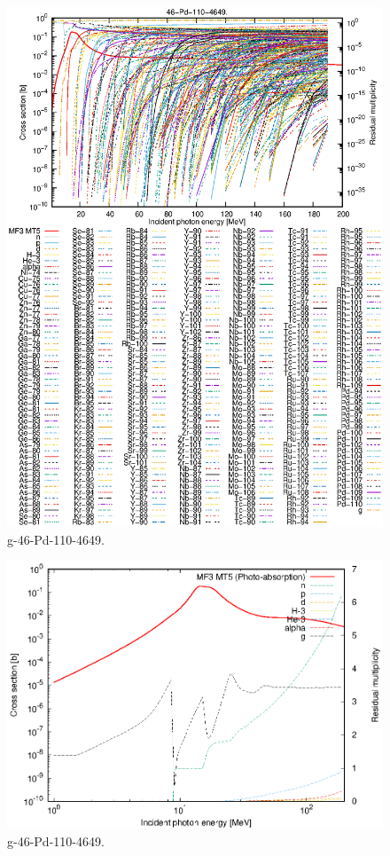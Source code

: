 \begin{figure}
 \includegraphics[width=\linewidth]{eps/g_46-Pd-110_4649.eps}
  \caption{g-46-Pd-110-4649.}
\end{figure}
\newpage \clearpage

\begin{figure}
 \includegraphics[width=\linewidth]{eps-log/g_46-Pd-110_4649.eps}
 \caption{g-46-Pd-110-4649.}
\end{figure}
\newpage \clearpage

